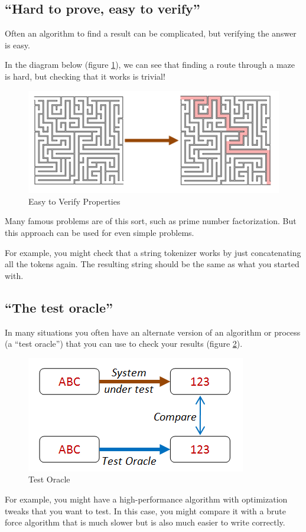 \subsection{``Hard to prove, easy to verify''}
\label{sec:hard_to_prove}

Often an algorithm to find a result can be complicated, but verifying the answer is easy.

In the diagram below (figure \ref{fig:choosing_properties_6}), we can see that finding a route through a maze is hard, but checking that it works is trivial!
\begin{figure}[htbp]
 \centering
 \includegraphics[width=.95\linewidth]{./pics/choosing_properties_6.png}
 \caption{Easy to Verify Properties}
 \label{fig:choosing_properties_6}
\end{figure}
Many famous problems are of this sort, such as prime number factorization. But this approach can be used for even simple problems.

For example, you might check that a string tokenizer works by just concatenating all the tokens again. The resulting string should be the same as what you started with.

\subsection{``The test oracle''}
\label{sec:the_test_oracle}

In many situations you often have an alternate version of an algorithm or process (a ``test oracle'') that you can use to check your results (figure \ref{fig:choosing_properties_7}).
\begin{figure}[htbp]
 \centering
 \includegraphics[width=.95\linewidth]{./pics/choosing_properties_7.png}
 \caption{Test Oracle}
 \label{fig:choosing_properties_7}
\end{figure}
For example, you might have a high-performance algorithm with optimization tweaks that you want to test. In this case, you might compare it with a brute force algorithm that is much slower but is also much easier to write correctly.

